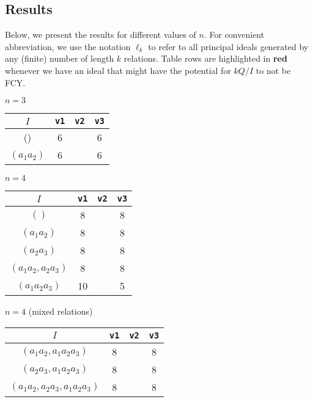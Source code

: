 \documentclass{article}
\begin{document}
\begin{flushleft}
   \newpage

   \section{Results}
   Below, we present the results for different values of $n$. For convenient abbreviation, we use the notation $\ell_k$ to refer to all principal 
   ideals generated by any (finite) number of length $k$ relations. Table rows are highlighted in {\color{red!50!white}\textbf{red}} whenever we have an ideal
   that might have the potential for $kQ/I$ to not be FCY.
   \begin{center}
      $n=3$
      \begin{longtable}{|c|c|c|c|}
         \hline
         $I$ & \texttt{v1} & \texttt{v2} & \texttt{v3} \\
         \hline 
         () & 6 & & 6 \\
         \hline
         $(a_1a_2)$ & 6 & & 6\\
         \hline
      \end{longtable}

      $n=4$

      \begin{longtable}{|c|c|c|c|}
         \hline 
         $I$ & \texttt{v1} & \texttt{v2} & \texttt{v3} \\
         \hline 
         $()$ & 8 && 8 \\
         \hhline{|=|=|=|=|}
         $(a_1a_2)$ & 8 & & 8\\
         $(a_2a_3)$ & 8 && 8\\
         $(a_1a_2, a_2a_3)$ & 8 && 8\\
         \hhline{|=|=|=|=|}
         $(a_1a_2a_3)$ & 10 && 5\\
         \hline
      \end{longtable}

      $n=4$ (mixed relations)

      \begin{longtable}{|c|c|c|c|}
         \hline 
         $I$ & \texttt{v1} & \texttt{v2} & \texttt{v3} \\
         \hline
         $(a_1a_2, a_1a_2a_3)$ & 8 & & 8\\
         $(a_2a_3, a_1a_2a_3)$ & 8 & & 8\\
         $(a_1a_2, a_2a_3, a_1a_2a_3)$ & 8 & & 8\\
         \hline
      \end{longtable}


\end{center}
\end{flushleft}
\end{document}
